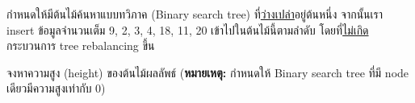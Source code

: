 \question{}

กำหนดให้มีต้นไม้ค้นหาแบบทวิภาค (Binary search tree) ที่\uline{ว่างเปล่า}อยู่ต้นหนึ่ง\;
จากนั้นเรา insert ข้อมูลจำนวนเต็ม 9, 2, 3, 4, 18, 11, 20 เข้าไปในต้นไม้นี้ตามลำดับ 
โดยที่\uline{ไม่เกิด}กระบวนการ tree rebalancing ขึ้น

จงหาความสูง (height) ของต้นไม้ผลลัพธ์\;
(\textbf{หมายเหตุ:} กำหนดให้ Binary search tree ที่มี node เดียวมีความสูงเท่ากับ 0)
